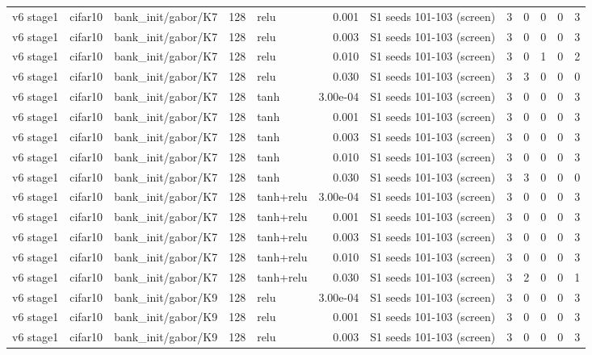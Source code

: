 \begin{table}[htbp]
{\begin{tabular}{@{}lllrlrlrrrrr@{}}
v6 stage1 & cifar10 & bank\_init/gabor/K7 & 128 & relu & 0.001 & S1 seeds 101-103 (screen) & 3 & 0 & 0 & 0 & 3 \\
v6 stage1 & cifar10 & bank\_init/gabor/K7 & 128 & relu & 0.003 & S1 seeds 101-103 (screen) & 3 & 0 & 0 & 0 & 3 \\
v6 stage1 & cifar10 & bank\_init/gabor/K7 & 128 & relu & 0.010 & S1 seeds 101-103 (screen) & 3 & 0 & 1 & 0 & 2 \\
v6 stage1 & cifar10 & bank\_init/gabor/K7 & 128 & relu & 0.030 & S1 seeds 101-103 (screen) & 3 & 3 & 0 & 0 & 0 \\
v6 stage1 & cifar10 & bank\_init/gabor/K7 & 128 & tanh & 3.00e-04 & S1 seeds 101-103 (screen) & 3 & 0 & 0 & 0 & 3 \\
v6 stage1 & cifar10 & bank\_init/gabor/K7 & 128 & tanh & 0.001 & S1 seeds 101-103 (screen) & 3 & 0 & 0 & 0 & 3 \\
v6 stage1 & cifar10 & bank\_init/gabor/K7 & 128 & tanh & 0.003 & S1 seeds 101-103 (screen) & 3 & 0 & 0 & 0 & 3 \\
v6 stage1 & cifar10 & bank\_init/gabor/K7 & 128 & tanh & 0.010 & S1 seeds 101-103 (screen) & 3 & 0 & 0 & 0 & 3 \\
v6 stage1 & cifar10 & bank\_init/gabor/K7 & 128 & tanh & 0.030 & S1 seeds 101-103 (screen) & 3 & 3 & 0 & 0 & 0 \\
v6 stage1 & cifar10 & bank\_init/gabor/K7 & 128 & tanh+relu & 3.00e-04 & S1 seeds 101-103 (screen) & 3 & 0 & 0 & 0 & 3 \\
v6 stage1 & cifar10 & bank\_init/gabor/K7 & 128 & tanh+relu & 0.001 & S1 seeds 101-103 (screen) & 3 & 0 & 0 & 0 & 3 \\
v6 stage1 & cifar10 & bank\_init/gabor/K7 & 128 & tanh+relu & 0.003 & S1 seeds 101-103 (screen) & 3 & 0 & 0 & 0 & 3 \\
v6 stage1 & cifar10 & bank\_init/gabor/K7 & 128 & tanh+relu & 0.010 & S1 seeds 101-103 (screen) & 3 & 0 & 0 & 0 & 3 \\
v6 stage1 & cifar10 & bank\_init/gabor/K7 & 128 & tanh+relu & 0.030 & S1 seeds 101-103 (screen) & 3 & 2 & 0 & 0 & 1 \\
v6 stage1 & cifar10 & bank\_init/gabor/K9 & 128 & relu & 3.00e-04 & S1 seeds 101-103 (screen) & 3 & 0 & 0 & 0 & 3 \\
v6 stage1 & cifar10 & bank\_init/gabor/K9 & 128 & relu & 0.001 & S1 seeds 101-103 (screen) & 3 & 0 & 0 & 0 & 3 \\
v6 stage1 & cifar10 & bank\_init/gabor/K9 & 128 & relu & 0.003 & S1 seeds 101-103 (screen) & 3 & 0 & 0 & 0 & 3 \\

\end{tabular}}
\end{table}
